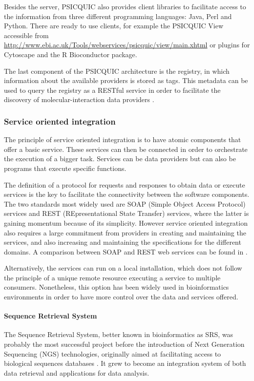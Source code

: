 Besides the server, PSICQUIC also provides client libraries to facilitate access to the information from three different programming languages: Java, Perl and Python. There are ready to use clients, for example the PSICQUIC View accessible from \url{http://www.ebi.ac.uk/Tools/webservices/psicquic/view/main.xhtml} or plugins for Cytoscape and the R Bioconductor package.

The last component of the PSICQUIC architecture is the registry, in which information about the available providers is stored as tags. This metadata can be used to query the registry as a RESTful service in order to facilitate the discovery of molecular-interaction data providers \cite{DEL2013}.


\subsubsection{Service oriented integration} 
The principle of service oriented integration is to have atomic components that offer a basic service. These services can then be connected in order to orchestrate the execution of a bigger task. Services can be data providers but can also be programs that execute specific functions.

The definition of a protocol for requests and responses to obtain data or execute services is the key to facilitate the connectivity between the software components. The two standards most widely used are SOAP (Simple Object Access Protocol) services and REST (REpresentational State Transfer) services, where the latter is gaining momentum because of its simplicity. However service oriented integration also requires a large commitment from providers in creating and maintaining the services, and also increasing and maintaining the specifications for the different domains. A comparison between SOAP and REST web services can be found in \cite{PAU2008}.

Alternatively, the services can run on a local installation, which does not follow the principle of a unique remote resource executing a service to multiple consumers. Nonetheless, this option has been widely used in bioinformatics environments in order to have more control over the data and services offered.

\paragraph{Sequence Retrieval System}

The Sequence Retrieval System, better known in bioinformatics as SRS, was probably the most successful project before the introduction of Next Generation Sequencing (NGS) technologies, originally aimed at facilitating access to biological sequences databases \cite{ETZ1996}. It grew to become an integration system of both data retrieval and applications for data analysis.

